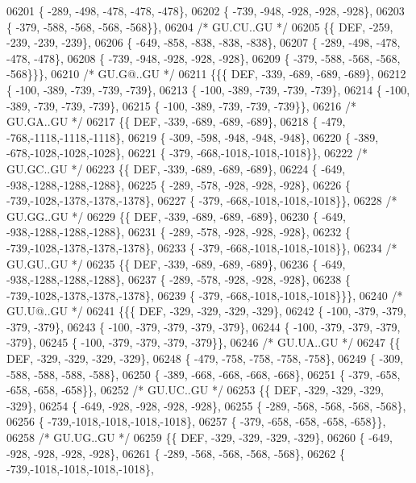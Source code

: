 \begin{DoxyCode}
06201 \{ -289, -498, -478, -478, -478\},
06202 \{ -739, -948, -928, -928, -928\},
06203 \{ -379, -588, -568, -568, -568\}\},
06204 \textcolor{comment}{/* GU.CU..GU */}
06205 \{\{  DEF, -259, -239, -239, -239\},
06206 \{ -649, -858, -838, -838, -838\},
06207 \{ -289, -498, -478, -478, -478\},
06208 \{ -739, -948, -928, -928, -928\},
06209 \{ -379, -588, -568, -568, -568\}\}\},
06210 \textcolor{comment}{/* GU.G@..GU */}
06211 \{\{\{  DEF, -339, -689, -689, -689\},
06212 \{ -100, -389, -739, -739, -739\},
06213 \{ -100, -389, -739, -739, -739\},
06214 \{ -100, -389, -739, -739, -739\},
06215 \{ -100, -389, -739, -739, -739\}\},
06216 \textcolor{comment}{/* GU.GA..GU */}
06217 \{\{  DEF, -339, -689, -689, -689\},
06218 \{ -479, -768,-1118,-1118,-1118\},
06219 \{ -309, -598, -948, -948, -948\},
06220 \{ -389, -678,-1028,-1028,-1028\},
06221 \{ -379, -668,-1018,-1018,-1018\}\},
06222 \textcolor{comment}{/* GU.GC..GU */}
06223 \{\{  DEF, -339, -689, -689, -689\},
06224 \{ -649, -938,-1288,-1288,-1288\},
06225 \{ -289, -578, -928, -928, -928\},
06226 \{ -739,-1028,-1378,-1378,-1378\},
06227 \{ -379, -668,-1018,-1018,-1018\}\},
06228 \textcolor{comment}{/* GU.GG..GU */}
06229 \{\{  DEF, -339, -689, -689, -689\},
06230 \{ -649, -938,-1288,-1288,-1288\},
06231 \{ -289, -578, -928, -928, -928\},
06232 \{ -739,-1028,-1378,-1378,-1378\},
06233 \{ -379, -668,-1018,-1018,-1018\}\},
06234 \textcolor{comment}{/* GU.GU..GU */}
06235 \{\{  DEF, -339, -689, -689, -689\},
06236 \{ -649, -938,-1288,-1288,-1288\},
06237 \{ -289, -578, -928, -928, -928\},
06238 \{ -739,-1028,-1378,-1378,-1378\},
06239 \{ -379, -668,-1018,-1018,-1018\}\}\},
06240 \textcolor{comment}{/* GU.U@..GU */}
06241 \{\{\{  DEF, -329, -329, -329, -329\},
06242 \{ -100, -379, -379, -379, -379\},
06243 \{ -100, -379, -379, -379, -379\},
06244 \{ -100, -379, -379, -379, -379\},
06245 \{ -100, -379, -379, -379, -379\}\},
06246 \textcolor{comment}{/* GU.UA..GU */}
06247 \{\{  DEF, -329, -329, -329, -329\},
06248 \{ -479, -758, -758, -758, -758\},
06249 \{ -309, -588, -588, -588, -588\},
06250 \{ -389, -668, -668, -668, -668\},
06251 \{ -379, -658, -658, -658, -658\}\},
06252 \textcolor{comment}{/* GU.UC..GU */}
06253 \{\{  DEF, -329, -329, -329, -329\},
06254 \{ -649, -928, -928, -928, -928\},
06255 \{ -289, -568, -568, -568, -568\},
06256 \{ -739,-1018,-1018,-1018,-1018\},
06257 \{ -379, -658, -658, -658, -658\}\},
06258 \textcolor{comment}{/* GU.UG..GU */}
06259 \{\{  DEF, -329, -329, -329, -329\},
06260 \{ -649, -928, -928, -928, -928\},
06261 \{ -289, -568, -568, -568, -568\},
06262 \{ -739,-1018,-1018,-1018,-1018\},

\end{DoxyCode}
